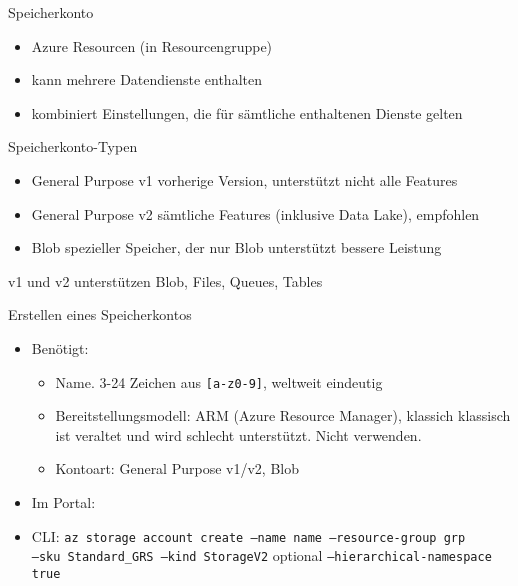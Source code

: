 \begin{flashcard}[Definition]{Speicherkonto}
    \begin{itemize}
        \item Azure Resourcen (in Resourcengruppe)
        \item kann mehrere Datendienste enthalten
        \item kombiniert Einstellungen, die für sämtliche enthaltenen Dienste gelten
    \end{itemize}
\end{flashcard}

\begin{flashcard}[Definition]{Speicherkonto-Typen}
    \begin{itemize}
        \item General Purpose v1\newline
            vorherige Version, unterstützt nicht alle Features
        \item General Purpose v2\newline
            sämtliche Features (inklusive Data Lake), empfohlen
        \item Blob\newline
            spezieller Speicher, der nur Blob unterstützt\newline
            bessere Leistung
    \end{itemize}
    v1 und v2 unterstützen Blob, Files, Queues, Tables
\end{flashcard}

\begin{flashcard}[Definition]{Erstellen eines Speicherkontos}
    \begin{itemize}
        \item Benötigt:
            \begin{itemize}
                \item Name. 3-24 Zeichen aus \texttt{[a-z0-9]}, weltweit eindeutig
                \item Bereitstellungsmodell: ARM (Azure Resource Manager), klassich\newline
                klassisch ist veraltet und wird schlecht unterstützt. Nicht verwenden.
                \item Kontoart: General Purpose v1/v2, Blob
            \end{itemize}
        \item Im Portal:
        \item CLI: \texttt{az storage account create --name name --resource-group grp\\ --sku Standard\_GRS --kind StorageV2}
    optional \texttt{--hierarchical-namespace true}
    \end{itemize}
\end{flashcard}

